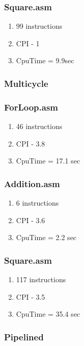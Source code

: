 \documentclass[10pt]{article}
\begin{document}
        \subsubsection{Square.asm}
        \begin{enumerate}
            \item 99 instructions
            \item CPI - 1
            \item CpuTime = 9.9sec
        \end{enumerate}

    \subsubsection{Multicycle}
        \subsubsection{ForLoop.asm}
        \begin{enumerate}
            \item 46 instructions
            \item CPI - 3.8
            \item CpuTime = 17.1 sec
        \end{enumerate}
        \subsubsection{Addition.asm}
        \begin{enumerate}
            \item 6 instructions
            \item CPI - 3.6
            \item CpuTime = 2.2 sec
        \end{enumerate}
        \subsubsection{Square.asm}
        \begin{enumerate}
            \item 117 instructions
            \item CPI - 3.5
            \item CpuTime = 35.4 sec
        \end{enumerate}

    \subsubsection{Pipelined}
\end{document}
